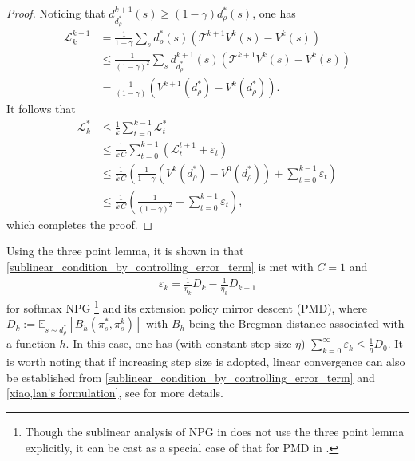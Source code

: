 \begin{proof}
    Noticing that $d_{d_\rho^*}^{k+1}(s)\geq (1-\gamma)d_\rho^*(s)$, one has 
\begin{align*}
\mathcal{L}_k^{k+1} & =\frac{1}{1-\gamma}\sum_sd_\rho^*(s)\left(\mathcal{T}^{k+1}V^k(s)- V^k(s)\right)\\
&\leq\frac{1}{(1-\gamma)^2}\sum_sd_{d_\rho^*}^{k+1}(s)\left(\mathcal{T}^{k+1}V^k(s)- V^k(s)\right)\\
&=\frac{1}{(1-\gamma)}\left(V^{k+1}(d_\rho^*)-V^k(d_\rho^*)\right).
\end{align*}
It follows that 
\begin{align*}
\mathcal{L}_k^*&\leq\frac{1}{k}\sum_{t=0}^{k-1}\mathcal{L}_t^*\\
&\leq \frac{1}{k\, C}\sum_{t=0}^{k-1}\left(\mathcal{L}_t^{t+1}+\varepsilon_t\right)\\
&\leq \frac{1}{k\,C}\left(\frac{1}{1-\gamma}\left(V^k(d_\rho^*)-V^0(d_\rho^*)\right)+\sum_{t=0}^{k-1}\varepsilon_t\right)\\
&\leq \frac{1}{k\,C}\left(\frac{1}{(1-\gamma)^2}+\sum_{t=0}^{k-1}\varepsilon_t\right),
\end{align*}
which completes the proof.
\end{proof}
\begin{remark}
    Using the three point lemma, it is shown in \textup{\cite{Agarwal_Kakade_Lee_Mahajan_2019,Xiao_2022,Lan_2021}}  that \eqref{sublinear_condition_by_controlling_error_term} is met with $C=1$ and 
\begin{align}
\varepsilon _k=\frac{1}{\eta _k}D_k-\frac{1}{\eta _k}D_{k+1}
\label{xiao,lan's formulation}
\end{align}
for softmax NPG \footnote{Though the sublinear analysis of NPG in \textup{\cite{Agarwal_Kakade_Lee_Mahajan_2019}} does not use the three point lemma explicitly, it can  be cast as a special case of that for PMD in \textup{\cite{Xiao_2022}}.} and its extension  policy mirror descent \textup{(}PMD\textup{)}, where $D_k:=\mathbb{E} _{s\sim d_{\rho}^{*}}\left[ B_h\left( \pi _{s}^{*},\pi _{s}^{k} \right) \right]$ with $B_h$ being the Bregman distance associated with a function  $h$. In this case, one has \textup{(}with constant step size $\eta$\textup{)}
$
\sum_{k=0}^{\infty}{\varepsilon _k}\leq \frac{1}{\eta}D_0.
$
It is worth noting that if increasing step size is adopted, linear convergence can also be established from \eqref{sublinear_condition_by_controlling_error_term} and \eqref{xiao,lan's formulation}, see \textup{\cite{Xiao_2022,Lan_2021,Li_Zhao_Lan_2022}} for more details.
\end{remark}




